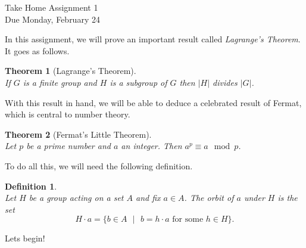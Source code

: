 \documentclass[11pt]{article}
\newtheorem{theorem}{Theorem}
\newtheorem{definition}{Definition}
\begin{document}
\begin{center}
\Large {Take Home Assignment 1}\\
\small {Due Monday, February 24}
\end{center}
In this assignment, we will prove an important result called \textit{Lagrange's Theorem}.  It goes as follows.
\begin{theorem}[Lagrange's Theorem]~\\
  If $G$ is a finite group and $H$ is a subgroup of $G$ then $|H|$ divides $|G|$.
\end{theorem}
With this result in hand, we will be able to deduce a celebrated result of Fermat, which is central to number theory.
\begin{theorem}[Fermat's Little Theorem]~\\
  Let $p$ be a prime number and $a$ an integer.  Then $a^p\equiv a\mod p$.
\end{theorem}
To do all this, we will need the following definition.
\begin{definition}~\\
  Let $H$ be a group acting on a set $A$ and fix $a\in A$.  The \textit{orbit} of $a$ under $H$ is the set
  \[H\cdot a = \{b\in A\text{ }|\text{ }b=h\cdot a\text{ for some }h\in H\}.\]
\end{definition}
Lets begin!
\end{document}
